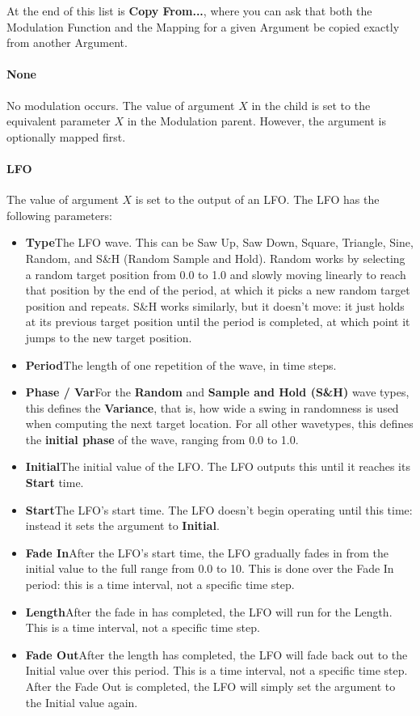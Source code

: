 \documentclass[twoside,10pt]{article}
\begin{document}
At the end of this list is {\bf Copy From...}, where you can ask that both the Modulation Function and the Mapping for a given Argument be copied exactly from another Argument.


\paragraph{None}

No modulation occurs.  The value of argument \(X\) in the child is set to the equivalent parameter \(X\) in the Modulation parent.  However, the argument is optionally mapped first.

\paragraph{LFO}

The value of argument \(X\) is set to the output of an LFO.  The LFO has the following parameters:

\begin{itemize}
\item {\bf Type}\qquad The LFO wave.  This can be Saw Up, Saw Down, Square, Triangle, Sine, Random, and S\&H (Random Sample and Hold).  Random works by selecting a random target position from 0.0 to 1.0 and slowly moving linearly to reach that position by the end of the period, at which it picks a new random target position and repeats.  S\&H works similarly, but it doesn't move: it just holds at its previous target position until the period is completed, at which point it jumps to the new target position.
\item {\bf Period}\qquad The length of one repetition of the wave, in time steps.
\item {\bf Phase / Var}\qquad For the {\bf Random} and {\bf Sample and Hold (S\&H)} wave types, this defines the {\bf Variance}, that is, how wide a swing in randomness is used when computing the next target location.  For all other wavetypes, this defines the {\bf initial phase} of the wave, ranging from 0.0 to 1.0.
\item {\bf Initial}\qquad The initial value of the LFO.   The LFO outputs this until it reaches its {\bf Start} time.
\item {\bf Start}\qquad The LFO's start time.  The LFO doesn't begin operating until this time: instead it sets the argument to {\bf Initial}.
\item {\bf Fade In}\qquad After the LFO's start time, the LFO gradually fades in from the initial value to the full range from 0.0 to 10.  This is done over the Fade In period: this is a time interval, not a specific time step.
\item {\bf Length}\qquad After the fade in has completed, the LFO will run for the Length.  This is a time interval, not a specific time step.
\item {\bf Fade Out}\qquad After the length has completed, the LFO will fade back out to the Initial value over this period.  This is a time interval, not a specific time step.  After the Fade Out is completed, the LFO will simply set the argument to the Initial value again.
\end{itemize}
\end{document}
